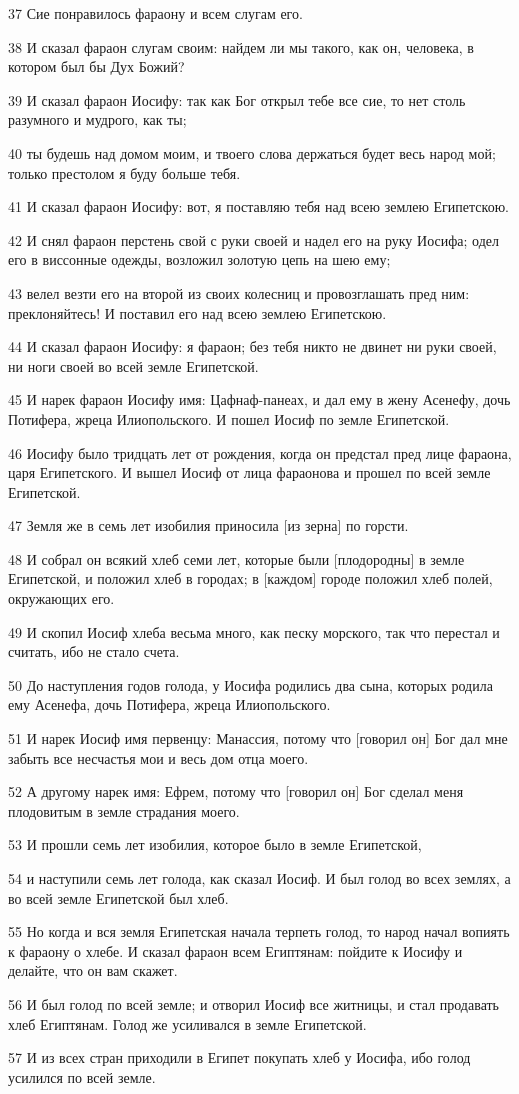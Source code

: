 \par 37 Сие понравилось фараону и всем слугам его.
\par 38 И сказал фараон слугам своим: найдем ли мы такого, как он, человека, в котором был бы Дух Божий?
\par 39 И сказал фараон Иосифу: так как Бог открыл тебе все сие, то нет столь разумного и мудрого, как ты;
\par 40 ты будешь над домом моим, и твоего слова держаться будет весь народ мой; только престолом я буду больше тебя.
\par 41 И сказал фараон Иосифу: вот, я поставляю тебя над всею землею Египетскою.
\par 42 И снял фараон перстень свой с руки своей и надел его на руку Иосифа; одел его в виссонные одежды, возложил золотую цепь на шею ему;
\par 43 велел везти его на второй из своих колесниц и провозглашать пред ним: преклоняйтесь! И поставил его над всею землею Египетскою.
\par 44 И сказал фараон Иосифу: я фараон; без тебя никто не двинет ни руки своей, ни ноги своей во всей земле Египетской.
\par 45 И нарек фараон Иосифу имя: Цафнаф-панеах, и дал ему в жену Асенефу, дочь Потифера, жреца Илиопольского. И пошел Иосиф по земле Египетской.
\par 46 Иосифу было тридцать лет от рождения, когда он предстал пред лице фараона, царя Египетского. И вышел Иосиф от лица фараонова и прошел по всей земле Египетской.
\par 47 Земля же в семь лет изобилия приносила [из зерна] по горсти.
\par 48 И собрал он всякий хлеб семи лет, которые были [плодородны] в земле Египетской, и положил хлеб в городах; в [каждом] городе положил хлеб полей, окружающих его.
\par 49 И скопил Иосиф хлеба весьма много, как песку морского, так что перестал и считать, ибо не стало счета.
\par 50 До наступления годов голода, у Иосифа родились два сына, которых родила ему Асенефа, дочь Потифера, жреца Илиопольского.
\par 51 И нарек Иосиф имя первенцу: Манассия, потому что [говорил он] Бог дал мне забыть все несчастья мои и весь дом отца моего.
\par 52 А другому нарек имя: Ефрем, потому что [говорил он] Бог сделал меня плодовитым в земле страдания моего.
\par 53 И прошли семь лет изобилия, которое было в земле Египетской,
\par 54 и наступили семь лет голода, как сказал Иосиф. И был голод во всех землях, а во всей земле Египетской был хлеб.
\par 55 Но когда и вся земля Египетская начала терпеть голод, то народ начал вопиять к фараону о хлебе. И сказал фараон всем Египтянам: пойдите к Иосифу и делайте, что он вам скажет.
\par 56 И был голод по всей земле; и отворил Иосиф все житницы, и стал продавать хлеб Египтянам. Голод же усиливался в земле Египетской.
\par 57 И из всех стран приходили в Египет покупать хлеб у Иосифа, ибо голод усилился по всей земле.

